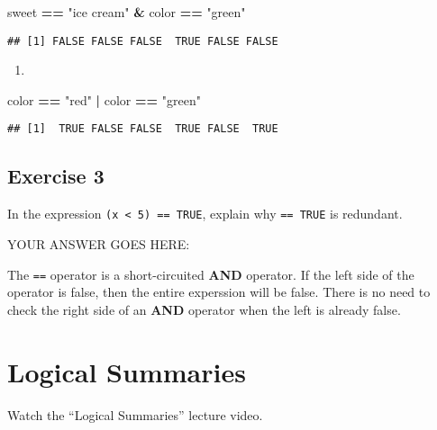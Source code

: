 \documentclass[
]{article}
\newenvironment{Shaded}{\begin{snugshade}}{\end{snugshade}}
\newcommand{\NormalTok}[1]{#1}
\newcommand{\OperatorTok}[1]{\textcolor[rgb]{0.81,0.36,0.00}{\textbf{#1}}}
\newcommand{\StringTok}[1]{\textcolor[rgb]{0.31,0.60,0.02}{#1}}
\providecommand{\tightlist}{%
  \setlength{\itemsep}{0pt}\setlength{\parskip}{0pt}}
\begin{document}
\begin{Shaded}
\begin{Highlighting}[]
\NormalTok{sweet }\OperatorTok{==}\StringTok{ "ice cream"} \OperatorTok{\&}\StringTok{ }\NormalTok{color }\OperatorTok{==}\StringTok{ "green"}
\end{Highlighting}
\end{Shaded}

\begin{verbatim}
## [1] FALSE FALSE FALSE  TRUE FALSE FALSE
\end{verbatim}

\begin{enumerate}
\def\labelenumi{\arabic{enumi}.}
\setcounter{enumi}{4}
\tightlist
\item
\end{enumerate}

\begin{Shaded}
\begin{Highlighting}[]
\NormalTok{color }\OperatorTok{==}\StringTok{ "red"} \OperatorTok{|}\StringTok{ }\NormalTok{color }\OperatorTok{==}\StringTok{ "green"}
\end{Highlighting}
\end{Shaded}

\begin{verbatim}
## [1]  TRUE FALSE FALSE  TRUE FALSE  TRUE
\end{verbatim}

\hypertarget{exercise-3}{%
\subsection{Exercise 3}\label{exercise-3}}

In the expression \texttt{(x\ \textless{}\ 5)\ ==\ TRUE}, explain why
\texttt{==\ TRUE} is redundant.

YOUR ANSWER GOES HERE:

The \texttt{==} operator is a short-circuited \textbf{AND} operator. If
the left side of the operator is false, then the entire experssion will
be false. There is no need to check the right side of an \textbf{AND}
operator when the left is already false.

\hypertarget{logical-summaries}{%
\section{Logical Summaries}\label{logical-summaries}}

Watch the ``Logical Summaries'' lecture video.
\end{document}
